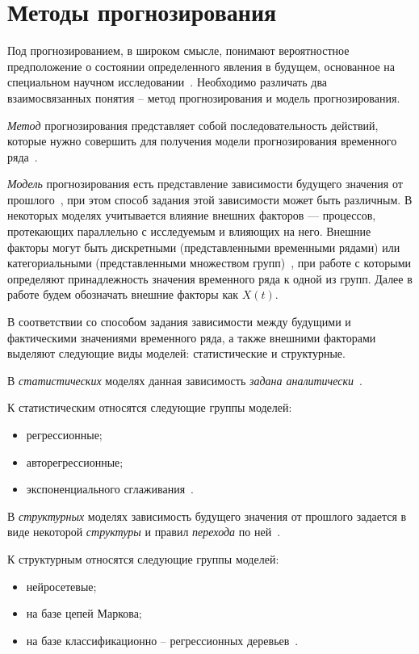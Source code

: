 \chapter{Методы прогнозирования}

Под прогнозированием, в широком смысле, понимают вероятностное предположение о состоянии определенного явления в будущем, основанное на специальном научном исследовании~\cite{aliref12}.
Необходимо различать два взаимосвязанных понятия -- метод прогнозирования и модель прогнозирования.

\textit{Метод} прогнозирования представляет собой последовательность действий, которые нужно совершить для получения модели прогнозирования временного ряда~\cite{myref12}.

\textit{Модель} прогнозирования есть представление зависимости будущего значения от прошлого~\cite{myref9, myref13},
при этом способ задания этой зависимости может быть различным.
В некоторых моделях учитывается влияние внешних факторов --- процессов,
протекающих параллельно с исследуемым и влияющих на него.
Внешние факторы могут быть дискретными (представленными временными рядами) или категориальными
(представленными множеством групп)~\cite{myref9, poliref9, poliref10},
при работе с которыми определяют принадлежность значения временного ряда к одной из групп.
Далее в работе будем обозначать внешние факторы как $X(t)$.

В соответствии со способом задания зависимости между будущими и фактическими значениями временного ряда, а также внешними факторами выделяют следующие виды моделей: статистические и структурные.

В \textit{статистических} моделях данная зависимость \textit{задана аналитически}~\cite{myref9}.

К статистическим относятся следующие группы моделей:

\begin{itemize}
\item регрессионные;
\item авторегрессионные;
\item экспоненциального сглаживания~\cite{myref9}.
\end{itemize}

В \textit{структурных} моделях зависимость будущего значения от прошлого задается в виде некоторой \textit{структуры} и правил \textit{перехода} по ней~\cite{myref9, myref13}.

К структурным относятся следующие группы моделей:

\begin{itemize}
\item нейросетевые;
\item на базе цепей Маркова;
\item на базе классификационно -- регрессионных деревьев~\cite{myref9}.
\end{itemize}

